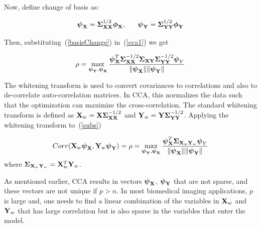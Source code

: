 \documentclass{llncs}
\newcommand{\X}{{\bf X}}
\newcommand{\Y}{{\bf Y}}
\newcommand{\bs}{\boldsymbol}
\begin{document}
Now, define change of basis as:

\begin{equation}
\label{basisChange}
\bs\psi_{\X} = \bs\Sigma_{\X\X}^{1/2}\bs\phi_{\X}, \;\;\;\;\;\;   \bs\psi_{\Y} = \bs\Sigma_{\Y\Y}^{1/2}\bs\phi_{\Y} 
\end{equation}

Then, substituting~(\ref{basisChange}) in~(\ref{cca1}) we get 

\begin{equation}
\label{subs}
\rho= \max_{{\bs\psi_{\Y}}, {\bs\psi_{\X}}} \frac{\bs\psi_{\X}^T \bs\Sigma_{\X\X}^{-1/2}\bs\Sigma_{\X\Y}\bs\Sigma_{\Y\Y}^{-1/2}\bs\psi_Y}{\|\bs\psi_{\X}\| \|\bs\psi_{\Y}\|}
\end{equation}

The whitening transform is used to convert covariances to correlations
and also to de-correlate auto-correlation matrices.  In CCA, this
normalizes the data such that the optimization can maximize the
cross-correlation.  The standard whitening transform is defined as
$\X_w= \X\bs\Sigma_{\X\X}^{-1/2}$ and $\Y_w=
\Y\bs\Sigma_{\Y\Y}^{-1/2}$.  Applying the whitening transform
to~(\ref{subs})

\begin{equation}
\label{simplifiedcca}
Corr(\X_w\bs\psi_{\X},\Y_w\bs\psi_{\Y})=\rho=\max_{{\bs\psi_{\Y}}, {\bs\psi_{\X}}} \frac{\bs\psi_{\X}^T \bs\Sigma_{\X_w\Y_w}\bs\psi_Y}{\|\bs\psi_{\X}\| \|\bs\psi_{\Y}\|}
\end{equation}
where $\bs\Sigma_{\X_w\Y_w} = \X_w^T\Y_w$. 

As mentioned earlier, CCA results in vectors $\bs\psi_{\X}$,
$\bs\psi_{\Y}$ that are not sparse, and these vectors are not unique
if $p > n$. In most biomedical imaging applications, $p$ is
large and, one needs to find a linear combination of the
variables in $\X_w$ and $\Y_w$ that has large correlation but is also
sparse in the variables that enter the model.  

\end{document}
